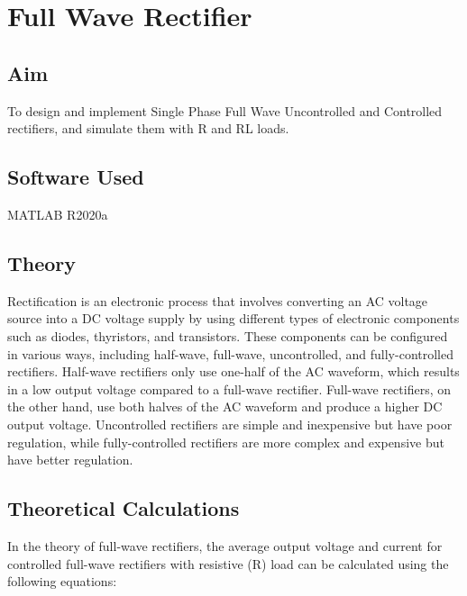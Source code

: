 \chapter{Full Wave Rectifier}
\vspace{-1cm}

\section{Aim}
\hspace{1cm}To design and implement Single Phase Full Wave Uncontrolled and Controlled rectifiers, and
simulate them with R and RL loads.

\section{Software Used}
\hspace{1cm}MATLAB R2020a
\section{Theory}
\hspace{\parindent}

Rectification is an electronic process that involves converting an AC voltage source into a DC voltage supply by using different types of electronic components such as diodes, thyristors, and transistors. These components can be configured in various ways, including half-wave, full-wave, uncontrolled, and fully-controlled rectifiers. Half-wave rectifiers only use one-half of the AC waveform, which results in a low output voltage compared to a full-wave rectifier. Full-wave rectifiers, on the other hand, use both halves of the AC waveform and produce a higher DC output voltage. Uncontrolled rectifiers are simple and inexpensive but have poor regulation, while fully-controlled rectifiers are more complex and expensive but have better regulation.


\section{Theoretical Calculations}
\hspace{\parindent}
In the theory of full-wave rectifiers, the average output voltage and current for controlled full-wave rectifiers with resistive (R) load can be calculated using the following equations:

